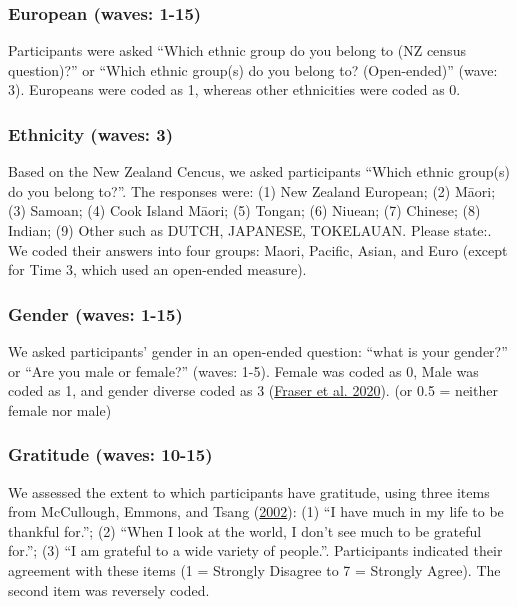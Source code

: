 \documentclass[
  singlecolumn]{report}
\begin{document}
\hypertarget{european-waves-1-15}{%
\subsubsection{European (waves: 1-15)}\label{european-waves-1-15}}

Participants were asked ``Which ethnic group do you belong to (NZ census
question)?'' or ``Which ethnic group(s) do you belong to? (Open-ended)''
(wave: 3). Europeans were coded as 1, whereas other ethnicities were
coded as 0.

\hypertarget{ethnicity-waves-3}{%
\subsubsection{Ethnicity (waves: 3)}\label{ethnicity-waves-3}}

Based on the New Zealand Cencus, we asked participants ``Which ethnic
group(s) do you belong to?''. The responses were: (1) New Zealand
European; (2) Māori; (3) Samoan; (4) Cook Island Māori; (5) Tongan; (6)
Niuean; (7) Chinese; (8) Indian; (9) Other such as DUTCH, JAPANESE,
TOKELAUAN. Please state:. We coded their answers into four groups:
Maori, Pacific, Asian, and Euro (except for Time 3, which used an
open-ended measure).

\hypertarget{gender-waves-1-15}{%
\subsubsection{Gender (waves: 1-15)}\label{gender-waves-1-15}}

We asked participants' gender in an open-ended question: ``what is your
gender?'' or ``Are you male or female?'' (waves: 1-5). Female was coded
as 0, Male was coded as 1, and gender diverse coded as 3
(\protect\hyperlink{ref-fraser_coding_2020}{Fraser et al. 2020}). (or
0.5 = neither female nor male)

\hypertarget{gratitude-waves-10-15}{%
\subsubsection{Gratitude (waves: 10-15)}\label{gratitude-waves-10-15}}

We assessed the extent to which participants have gratitude, using three
items from McCullough, Emmons, and Tsang
(\protect\hyperlink{ref-mccullough_grateful_2002}{2002}): (1) ``I have
much in my life to be thankful for.''; (2) ``When I look at the world, I
don't see much to be grateful for.''; (3) ``I am grateful to a wide
variety of people.''. Participants indicated their agreement with these
items (1 = Strongly Disagree to 7 = Strongly Agree). The second item was
reversely coded.
\end{document}
